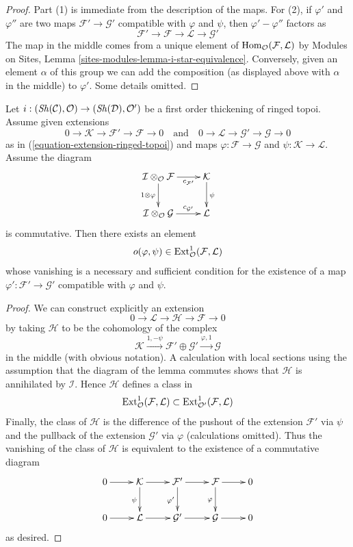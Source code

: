 \begin{proof}
Part (1) is immediate from the description of the maps.
For (2), if $\varphi'$ and $\varphi''$ are two maps
$\mathcal{F}' \to \mathcal{G}'$ compatible with $\varphi$
and $\psi$, then $\varphi' - \varphi''$ factors as
$$
\mathcal{F}' \to \mathcal{F} \to \mathcal{L} \to \mathcal{G}'
$$
The map in the middle comes from a unique element of
$\mathop{\mathrm{Hom}}\nolimits_\mathcal{O}(\mathcal{F}, \mathcal{L})$ by
Modules on Sites, Lemma \ref{sites-modules-lemma-i-star-equivalence}.
Conversely, given an element $\alpha$ of this group we can add the
composition (as displayed above with $\alpha$ in the middle)
to $\varphi'$. Some details omitted.
\end{proof}

\begin{lemma}
\label{lemma-inf-obs-map-ringed-topoi}
Let $i : (\mathop{\mathit{Sh}}\nolimits(\mathcal{C}), \mathcal{O}) \to (\mathop{\mathit{Sh}}\nolimits(\mathcal{D}), \mathcal{O}')$
be a first order thickening of ringed topoi. Assume given extensions
$$
0 \to \mathcal{K} \to \mathcal{F}' \to \mathcal{F} \to 0
\quad\text{and}\quad
0 \to \mathcal{L} \to \mathcal{G}' \to \mathcal{G} \to 0
$$
as in (\ref{equation-extension-ringed-topoi})
and maps $\varphi : \mathcal{F} \to \mathcal{G}$ and
$\psi : \mathcal{K} \to \mathcal{L}$. Assume the diagram
$$
\xymatrix{
\mathcal{I} \otimes_\mathcal{O} \mathcal{F}
\ar[r]_-{c_{\mathcal{F}'}} \ar[d]_{1 \otimes \varphi} &
\mathcal{K} \ar[d]^\psi \\
\mathcal{I} \otimes_\mathcal{O} \mathcal{G}
\ar[r]^-{c_{\mathcal{G}'}} &
\mathcal{L}
}
$$
is commutative. Then there exists an element
$$
o(\varphi, \psi) \in
\mathop{\mathrm{Ext}}\nolimits^1_\mathcal{O}(\mathcal{F}, \mathcal{L})
$$
whose vanishing is a necessary and sufficient condition for the existence
of a map $\varphi' : \mathcal{F}' \to \mathcal{G}'$ compatible with
$\varphi$ and $\psi$.
\end{lemma}

\begin{proof}
We can construct explicitly an extension
$$
0 \to \mathcal{L} \to \mathcal{H} \to \mathcal{F} \to 0
$$
by taking $\mathcal{H}$ to be the cohomology of the complex
$$
\mathcal{K}
\xrightarrow{1, - \psi}
\mathcal{F}' \oplus \mathcal{G}' \xrightarrow{\varphi, 1}
\mathcal{G}
$$
in the middle (with obvious notation). A calculation with local sections
using the assumption that the diagram of the lemma commutes
shows that $\mathcal{H}$ is annihilated by $\mathcal{I}$. Hence
$\mathcal{H}$ defines a class in
$$
\mathop{\mathrm{Ext}}\nolimits^1_\mathcal{O}(\mathcal{F}, \mathcal{L})
\subset
\mathop{\mathrm{Ext}}\nolimits^1_{\mathcal{O}'}(\mathcal{F}, \mathcal{L})
$$
Finally, the class of $\mathcal{H}$ is the difference of the pushout
of the extension $\mathcal{F}'$ via $\psi$ and the pullback
of the extension $\mathcal{G}'$ via $\varphi$ (calculations omitted).
Thus the vanishing of the class of $\mathcal{H}$ is equivalent to the
existence of a commutative diagram
$$
\xymatrix{
0 \ar[r] &
\mathcal{K} \ar[r] \ar[d]_{\psi} &
\mathcal{F}' \ar[r] \ar[d]_{\varphi'} &
\mathcal{F} \ar[r] \ar[d]_\varphi & 0\\
0 \ar[r] &
\mathcal{L} \ar[r] &
\mathcal{G}' \ar[r] &
\mathcal{G} \ar[r] & 0
}
$$
as desired.
\end{proof}

